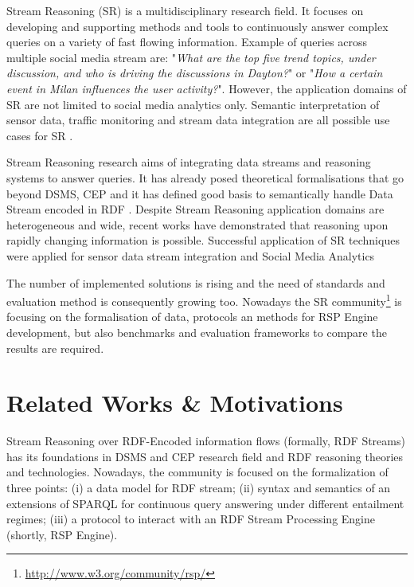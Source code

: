 Stream Reasoning (SR) is a multidisciplinary research field. It focuses on developing and supporting methods and tools to continuously answer complex queries on a variety of fast flowing information. Example of queries across multiple social media stream are: "\textit{What are the top five trend topics, under discussion, and who is driving the discussions in Dayton?}" or "\textit{How a certain event in Milan influences the user activity?}". However, the application domains of SR are not limited to social media analytics only. Semantic interpretation of sensor data, traffic monitoring and stream data integration are all possible use cases for SR \cite{DBLP:journals/expert/ValleCHF09}.

Stream Reasoning research aims of integrating data streams and reasoning systems to answer queries. It has already posed theoretical formalisations that go beyond DSMS, CEP  \cite{DBLP:conf/debs/KomazecCF12, Lephuoc2011, 4618773} and it has defined good basis to semantically handle Data Stream encoded in RDF \cite{DBLP:conf/fis/ValleCBBC08, DBLP:journals/sigmod/BarbieriBCVG10}. Despite Stream Reasoning application domains are heterogeneous and wide, recent works have demonstrated that reasoning upon rapidly changing information is possible. Successful application of SR techniques were applied for sensor data stream integration \cite{DBLP:journals/ijswis/CalbimonteJCA12,DBLP:journals/ws/LecueTHTBST14} and Social Media Analytics \cite{DBLP:journals/ws/BalduiniCDVHLKT12}

The number of implemented solutions is rising and the need of standards and evaluation method is consequently growing too. Nowadays the SR community\footnote{\url{http://www.w3.org/community/rsp/}} is focusing on the formalisation of data, protocols an methods for RSP Engine development, but also benchmarks and evaluation frameworks to compare the results are required.


\section{Related Works \& Motivations}\label{sec:motivations-intro}

Stream Reasoning over RDF-Encoded information flows (formally, RDF Streams) has its foundations in DSMS and CEP research field and RDF reasoning theories and technologies. Nowadays, the community is focused on the formalization of three points:  (i) a data model for RDF stream; (ii) syntax and semantics of an extensions of SPARQL for continuous query answering under different entailment regimes; (iii) a protocol to interact with an RDF Stream Processing Engine (shortly, RSP Engine). 

